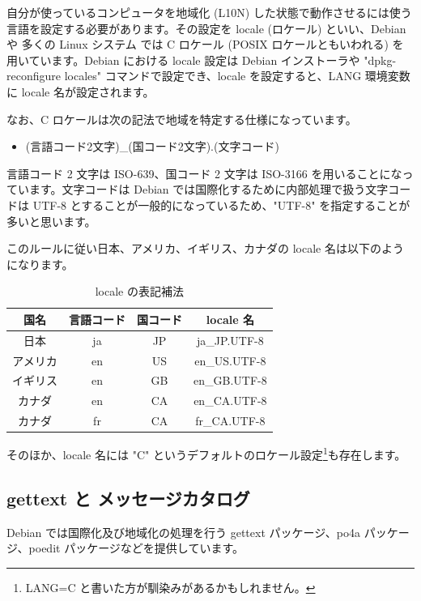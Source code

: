 \documentclass[mingoth,a4paper]{jsarticle}
\begin{document}
自分が使っているコンピュータを地域化 (L10N) した状態で動作させるには使う言語を設定する必要があります。その設定を locale (ロケール) といい、Debian や 多くの Linux システム では C ロケール (POSIX ロケールともいわれる) を用いています。Debian における locale 設定は Debian インストーラや "dpkg-reconfigure locales" コマンドで設定でき、locale を設定すると、LANG 環境変数に locale 名が設定されます。

なお、C ロケールは次の記法で地域を特定する仕様になっています。

\begin{itemize}
\item (言語コード2文字)\_(国コード2文字).(文字コード)
\end{itemize}

言語コード 2 文字は ISO-639、国コード 2 文字は ISO-3166 を用いることになっています。文字コードは Debian では国際化するために内部処理で扱う文字コードは UTF-8 とすることが一般的になっているため、"UTF-8" を指定することが多いと思います。

このルールに従い日本、アメリカ、イギリス、カナダの locale 名は以下のようになります。

\begin{table}[hbtp]
  \caption{locale の表記補法}
  \label{table:locale_display}
  \centering
  \begin{tabular}{cccc}
    \hline
    国名 & 言語コード & 国コード & locale 名 \\
    \hline
    日本 & ja & JP & ja\_JP.UTF-8 \\
    アメリカ & en & US & en\_US.UTF-8 \\
    イギリス & en & GB & en\_GB.UTF-8 \\
    カナダ & en & CA & en\_CA.UTF-8 \\
    カナダ & fr & CA & fr\_CA.UTF-8 \\
    \hline
  \end{tabular}
\end{table}

そのほか、locale 名には "C" というデフォルトのロケール設定\footnote{LANG=C と書いた方が馴染みがあるかもしれません。}も存在します。

\subsection{gettext と メッセージカタログ}

Debian では国際化及び地域化の処理を行う gettext パッケージ、po4a パッケージ、poedit パッケージなどを提供しています。
\end{document}
